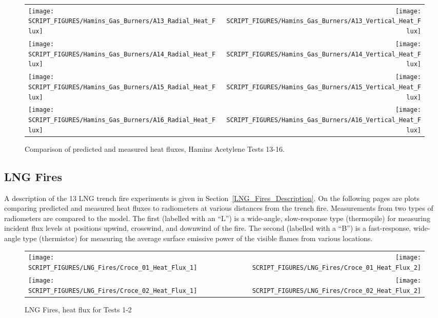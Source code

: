 \begin{figure}[p]
\begin{tabular*}{\textwidth}{l@{\extracolsep{\fill}}r}
\texttt{[image: SCRIPT\_FIGURES/Hamins\_Gas\_Burners/A13\_Radial\_Heat\_Flux]} &
\texttt{[image: SCRIPT\_FIGURES/Hamins\_Gas\_Burners/A13\_Vertical\_Heat\_Flux]} \\
\texttt{[image: SCRIPT\_FIGURES/Hamins\_Gas\_Burners/A14\_Radial\_Heat\_Flux]} &
\texttt{[image: SCRIPT\_FIGURES/Hamins\_Gas\_Burners/A14\_Vertical\_Heat\_Flux]} \\
\texttt{[image: SCRIPT\_FIGURES/Hamins\_Gas\_Burners/A15\_Radial\_Heat\_Flux]} &
\texttt{[image: SCRIPT\_FIGURES/Hamins\_Gas\_Burners/A15\_Vertical\_Heat\_Flux]} \\
\texttt{[image: SCRIPT\_FIGURES/Hamins\_Gas\_Burners/A16\_Radial\_Heat\_Flux]} &
\texttt{[image: SCRIPT\_FIGURES/Hamins\_Gas\_Burners/A16\_Vertical\_Heat\_Flux]}
\end{tabular*}
\label{Hamins_Acetylene_13-16}
\caption[Heat flux predictions, Hamins acetylene burner Tests 13-16]
{Comparison of predicted and measured heat fluxes, Hamins Acetylene Tests 13-16.}
\end{figure}

\clearpage

\subsection{LNG Fires}

A description of the 13 LNG trench fire experiments is given in Section~\ref{LNG_Fires_Description}. On the following pages are plots comparing predicted and measured heat fluxes to radiometers at various distances from the trench fire. Measurements from two types of radiometers are compared to the model. The first (labelled with an ``L'') is a wide-angle, slow-response type (thermopile) for measuring incident flux levels at positions upwind, crosswind, and downwind of the fire. The second (labelled with a ``B'') is a fast-response, wide-angle type (thermistor) for measuring the average surface emissive power of the visible flames from various locations.

\begin{figure}[!h]
\begin{tabular*}{\textwidth}{l@{\extracolsep{\fill}}r}
\texttt{[image: SCRIPT\_FIGURES/LNG\_Fires/Croce\_01\_Heat\_Flux\_1]} &
\texttt{[image: SCRIPT\_FIGURES/LNG\_Fires/Croce\_01\_Heat\_Flux\_2]} \\
\texttt{[image: SCRIPT\_FIGURES/LNG\_Fires/Croce\_02\_Heat\_Flux\_1]} &
\texttt{[image: SCRIPT\_FIGURES/LNG\_Fires/Croce\_02\_Heat\_Flux\_2]}
\end{tabular*}
\caption[LNG Fires, heat flux for Tests 1-2]
{LNG Fires, heat flux for Tests 1-2}
\label{Croce_Heat_Flux_1}
\end{figure}


